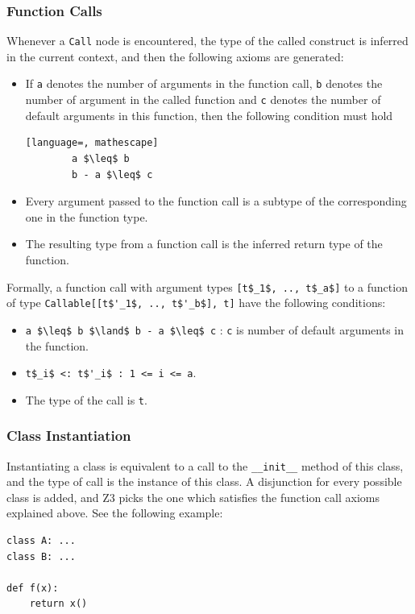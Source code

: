 \subsubsection{Function Calls}
Whenever a \lstinline|Call| node is encountered, the type of the called construct is inferred in the current context, and then the following axioms are generated:
\begin{itemize}
	\item If \lstinline|a| denotes the number of arguments in the function call, \lstinline|b| denotes the number of argument in the called function and \lstinline|c| denotes the number of default arguments in this function, then the following condition must hold
	\begin{lstlisting}[language=, mathescape]
		a $\leq$ b
		b - a $\leq$ c
	\end{lstlisting}
	
	\item Every argument passed to the function call is a subtype of the corresponding one in the function type.
	
	\item The resulting type from a function call is the inferred return type of the function.
\end{itemize}

Formally, a function call with argument types \lstinline[mathescape]|[t$_1$, .., t$_a$]| to a function of type \lstinline[mathescape]|Callable[[t$'_1$, .., t$'_b$], t]| have the following conditions:
\begin{itemize}
	\item \lstinline[mathescape]|a $\leq$ b $\land$ b - a $\leq$ c| : \lstinline|c| is number of default arguments in the function.
	\item \lstinline[mathescape]|t$_i$ <: t$'_i$ : 1 <= i <= a|.
	\item The type of the call is \lstinline|t|.
\end{itemize}

\subsubsection{Class Instantiation}
Instantiating a class is equivalent to a call to the \lstinline|__init__| method of this class, and the type of call is the instance of this class. A disjunction for every possible class is added, and Z3 picks the one which satisfies the function call axioms explained above. See the following example:
\begin{lstlisting}
class A: ...
class B: ...

def f(x):
	return x()
\end{lstlisting}

